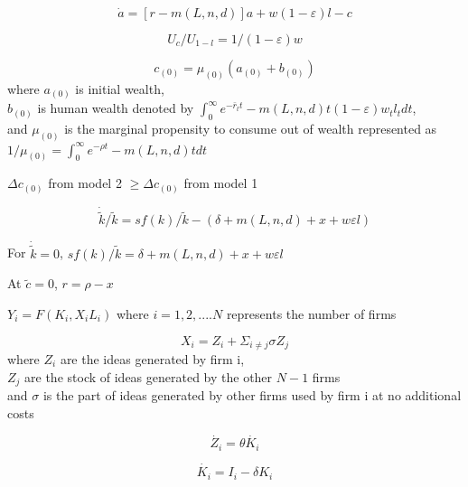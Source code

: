 \documentclass[12pt]{article}%
\begin{document}
\begin{equation}
\dot{a} = [r - m(L,n ,d)]a + w(1- \varepsilon)l -c
\end{equation}

\begin{equation}
U_{c}/U_{1-l} = 1/(1- \varepsilon)w
\end{equation}

\begin{equation}
c_{(0)} = \mu_{(0)} (a_{(0)} + b_{(0)})
\end{equation}
where $a_{(0)}$ is initial wealth, \\
 $b_{(0)}$ is human wealth denoted by $\int_{0}^{\infty} e^{-\bar{r}_{t}t} - m(L,n,d)t (1- \varepsilon) w_{t} l_{t} dt$, \\
and $\mu_{(0)}$ is the marginal propensity to consume out of wealth represented as $1/\mu_{(0)} = \int_{0}^{\infty} e^{-\rho t} - m(L,n ,d)  t dt$

$\Delta c_{(0)}$ from model 2 $\geq \Delta c_{(0)}$ from model 1 

\begin{equation}
\dot{\tilde{k}}/\tilde k = s f(k) / \tilde k - (\delta + m(L,n ,d) + x + w\varepsilon l)
\end{equation}

For $\dot{\tilde{k}} = 0$, $s f(k)/\tilde{k} = \delta + m(L,n ,d) + x + w\varepsilon l$

At $\tilde{c} = 0$, $r = \rho - x$


$Y_{i} = F(K_{i}, X_{i}L_{i})$  where $i =  1, 2,....N$ represents the number of firms

\begin{equation}
X_{i} = Z_{i} + \Sigma_{i\neq j} \sigma Z_{j} 
\end{equation}
where $Z_{i}$ are the ideas generated by firm i, \\ $ Z_{j}$ are the stock of ideas generated by the other $N-1$ firms \\
and $\sigma$ is the part of ideas generated by other firms used by firm i at no additional costs

\begin{equation}
\dot{Z_{i}} = \theta \dot{K_{i}}
\end{equation}

\begin{equation}
\dot{K_{i}} = I_{i} - \delta K_{i}
\end{equation}
\end{document}

